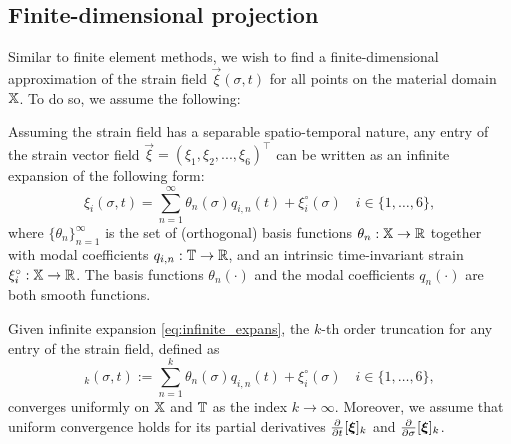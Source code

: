 \subsection{Finite-dimensional projection}
Similar to finite element methods, we wish to find a finite-dimensional approximation of the strain field $\vec{\xi}(\sigma,t)$ for all points on the material domain $\mathbb{X}$. To do so, we assume the following:
%
\begin{asm}
\vspace{1mm}
Assuming the strain field has a separable spatio-temporal nature, any entry of the strain vector field $\vec{\xi} = \left( \xi_1, \xi_2, ..., \xi_6 \right)^\top$ can be written as an infinite expansion of the following form:
%
\begin{equation}
\xi_i(\sigma,t) = \sum_{n=1}^\infty \theta_{n}(\sigma)q_{i,n}(t) + \xi^\circ_{i}(\sigma) \quad i\in\{1,\hdots,6\},
\label{eq:infinite_expans}
\end{equation}
%
where $\{\theta_{n}\}^\infty_{n=1}$ is the set of (orthogonal) basis functions $\theta_{n}: \mathbb{X} \to \mathbb{R}$ together with modal coefficients $q_{i,n}: \mathbb{T} \to \mathbb{R}$, and an intrinsic time-invariant strain $\xi^\circ_{i}: \mathbb{X} \to \mathbb{R}$. The basis functions $\theta_{n}(\cdot)$ and the modal coefficients $q_n(\cdot)$ are both smooth functions.
\end{asm}

\begin{asm}
Given infinite expansion \eqref{eq:infinite_expans}, the $k$-th order truncation for any entry of the strain field, defined as
%
\begin{equation}
[\xi_i]_k(\sigma,t) := \sum_{n=1}^k \theta_n(\sigma)q_{i,n}(t) + \xi^\circ_{i}(\sigma) \quad i\in\{1,\hdots,6\},
\end{equation}
%
converges uniformly on $\mathbb{X}$ and $\mathbb{T}$ as the index $k \to \infty$. Moreover, we assume that uniform convergence holds for its partial derivatives $\tfrac{\partial}{\partial t} [\boldsymbol{\xi}]_k$ and $\tfrac{\partial}{\partial \sigma} [\boldsymbol{\xi}]_k$.
\end{asm}

